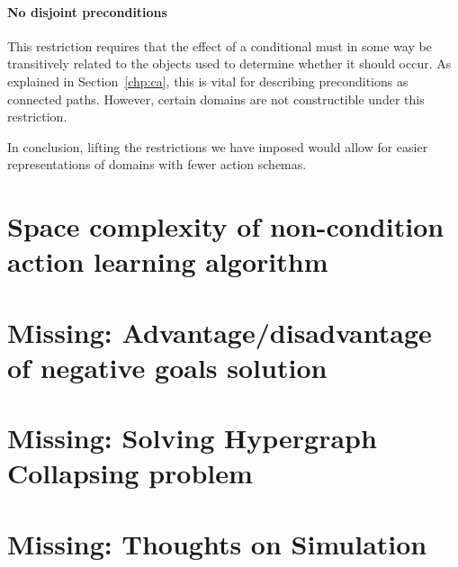 \documentclass[Master.tex]{subfiles}
\begin{document}
\paragraph{No disjoint preconditions}
This restriction requires that the effect of a conditional must in some way be transitively related to the objects used to determine whether it should occur. As explained in Section~\ref{chp:ca}, this is vital for describing preconditions as connected paths. However, certain domains are not constructible under this restriction. 


In conclusion, lifting the restrictions we have imposed would allow for easier representations of domains with fewer action schemas. 

\section{Space complexity of non-condition action learning algorithm}


\section{Missing: Advantage/disadvantage of negative goals solution}

\section{Missing: Solving Hypergraph Collapsing problem}

\section{Missing: Thoughts on Simulation}

%    
%
%    
%
%    
\end{document}
